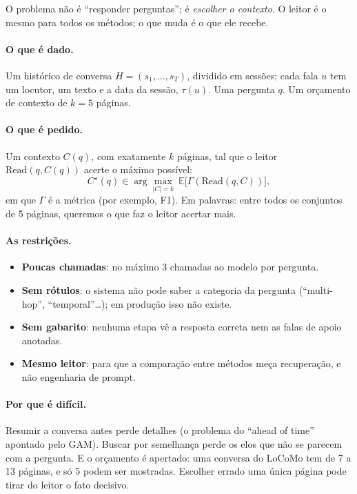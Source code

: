 \documentclass[11pt]{article}
\begin{document}
\begin{ideia}
O problema não é ``responder perguntas''; é \emph{escolher o contexto}.
O leitor é o mesmo para todos os métodos; o que muda é o que ele recebe.
\end{ideia}

\paragraph{O que é dado.}
Um histórico de conversa $H=(s_1,\dots,s_T)$, dividido em sessões; cada fala
$u$ tem um locutor, um texto e a data da sessão, $\tau(u)$. Uma pergunta $q$.
Um orçamento de contexto de $k=5$ páginas.

\paragraph{O que é pedido.}
Um contexto $C(q)$, com exatamente $k$ páginas, tal que o leitor
$\mathrm{Read}(q,C(q))$ acerte o máximo possível:
\[
C^\star(q)\in\arg\max_{|C|=k}\ \mathbb{E}\bigl[\Gamma(\mathrm{Read}(q,C))\bigr],
\]
em que $\Gamma$ é a métrica (por exemplo, F1). Em palavras: entre todos os
conjuntos de 5 páginas, queremos o que faz o leitor acertar mais.

\paragraph{As restrições.}
\begin{itemize}[nosep]
\item \textbf{Poucas chamadas}: no máximo 3 chamadas ao modelo por pergunta.
\item \textbf{Sem rótulos}: o sistema não pode saber a categoria da pergunta
(``multi-hop'', ``temporal''\dots); em produção isso não existe.
\item \textbf{Sem gabarito}: nenhuma etapa vê a resposta correta nem as falas
de apoio anotadas.
\item \textbf{Mesmo leitor}: para que a comparação entre métodos meça
recuperação, e não engenharia de prompt.
\end{itemize}

\paragraph{Por que é difícil.}
Resumir a conversa antes perde detalhes (o problema do ``ahead of time''
apontado pelo GAM). Buscar por semelhança perde os elos que não se parecem com
a pergunta. E o orçamento é apertado: uma conversa do LoCoMo tem de 7 a 13
páginas, e só 5 podem ser mostradas. Escolher errado uma única página pode
tirar do leitor o fato decisivo.
\end{document}
